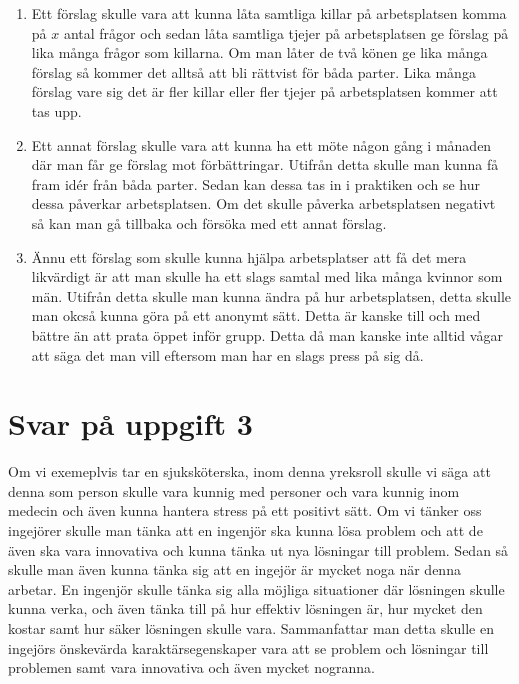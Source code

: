 \documentclass[a4paper,12pt]{article}
\begin{document}
\begin{enumerate}
  \item Ett förslag skulle vara att kunna låta samtliga killar på arbetsplatsen 
  komma på $x$ antal frågor och sedan låta samtliga tjejer på arbetsplatsen ge
  förslag på lika många frågor som killarna. Om man låter de två könen ge lika
  många förslag så kommer det alltså att bli rättvist för båda parter. Lika många
  förslag vare sig det är fler killar eller fler tjejer på arbetsplatsen kommer 
  att tas upp.
  \item Ett annat förslag skulle vara att kunna ha ett möte någon gång i 
  månaden där man får ge förslag mot förbättringar. Utifrån detta skulle man 
  kunna få fram idér från båda parter. Sedan kan dessa tas in i praktiken och 
  se hur dessa påverkar arbetsplatsen. Om det skulle påverka arbetsplatsen 
  negativt så kan man gå tillbaka och försöka med ett annat förslag.
 \item Ännu ett förslag som skulle kunna hjälpa arbetsplatser att få det mera
  likvärdigt är att man skulle ha ett slags samtal med lika många kvinnor som män.
  Utifrån detta skulle man kunna ändra på hur arbetsplatsen, detta skulle man 
  okcså kunna göra på ett anonymt sätt. Detta är kanske till och med bättre än 
  att prata öppet inför grupp. Detta då man kanske inte alltid vågar att säga 
  det man vill eftersom man har en slags press på sig då. 
\end{enumerate}
  
\section*{Svar på uppgift 3}



Om vi exemeplvis tar en sjuksköterska, inom denna yreksroll skulle
vi säga att denna som person skulle vara kunnig med personer och vara kunnig 
inom medecin och även kunna hantera stress på ett positivt sätt. Om vi tänker 
oss ingejörer skulle man tänka att en ingenjör ska kunna lösa problem och att de
även ska vara innovativa och kunna tänka ut nya lösningar till problem. Sedan
så skulle man även kunna tänka sig att en ingejör är mycket noga när denna arbetar.
En ingenjör skulle tänka sig alla möjliga situationer där lösningen skulle kunna verka, 
och även tänka till på hur effektiv lösningen är, hur mycket den kostar samt hur 
säker lösningen skulle vara. Sammanfattar man detta skulle en ingejörs önskevärda 
karaktärsegenskaper vara att se problem och lösningar till problemen samt vara 
innovativa och även mycket nogranna.
\end{document}
